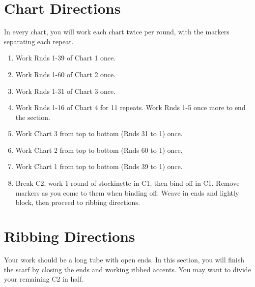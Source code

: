 \documentclass[12pt]{article}
\begin{document}
\section*{Chart Directions}
In every chart, you will work each chart twice per round, with the markers separating each repeat.
\begin{enumerate}[itemsep=0mm]
\item Work Rnds 1-39 of Chart 1 once.
\item Work Rnds 1-60 of Chart 2 once.
\item Work Rnds 1-31 of Chart 3 once. 
\item Work Rnds 1-16 of Chart 4 for 11 repeats. %
Work Rnds 1-5 once more to end the section.
\item Work Chart 3 from top to bottom (Rnds 31 to 1) once.
\item Work Chart 2 from top to bottom (Rnds 60 to 1) once.
\item Work Chart 1 from top to bottom (Rnds 39 to 1) once.
\item Break C2, work 1 round of stockinette in C1, then bind off in C1. Remove markers as you come to them when binding off. Weave in ends and lightly block, then proceed to ribbing directions.
\end{enumerate}

\section*{Ribbing Directions}

Your work should be a long tube with open ends. In this section, you will finish the scarf by closing the ends and working ribbed accents. You may want to divide your remaining C2 in half.
\end{document}
